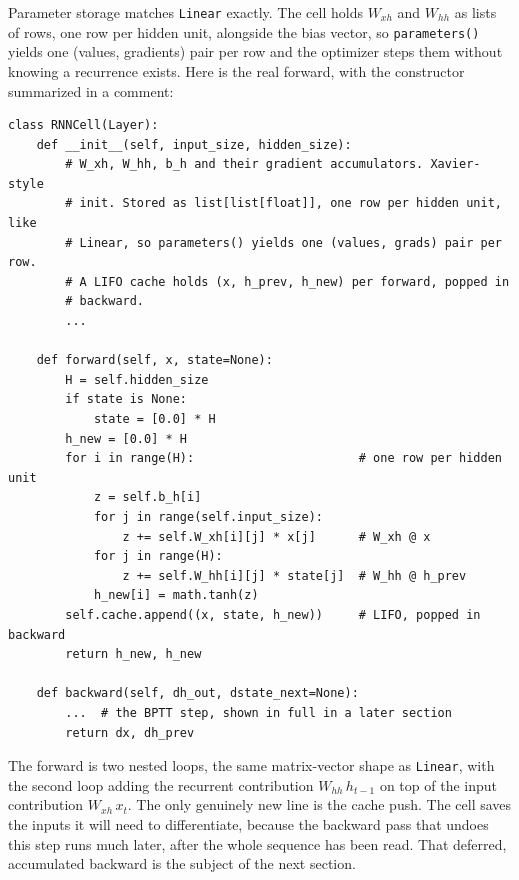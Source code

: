 Parameter storage matches \texttt{Linear} exactly. The cell holds $W_{xh}$
and $W_{hh}$ as lists of rows, one row per hidden unit, alongside the bias
vector, so \texttt{parameters()} yields one (values, gradients) pair per row
and the optimizer steps them without knowing a recurrence exists. Here is
the real forward, with the constructor summarized in a comment:
\begin{lstlisting}
class RNNCell(Layer):
    def __init__(self, input_size, hidden_size):
        # W_xh, W_hh, b_h and their gradient accumulators. Xavier-style
        # init. Stored as list[list[float]], one row per hidden unit, like
        # Linear, so parameters() yields one (values, grads) pair per row.
        # A LIFO cache holds (x, h_prev, h_new) per forward, popped in
        # backward.
        ...

    def forward(self, x, state=None):
        H = self.hidden_size
        if state is None:
            state = [0.0] * H
        h_new = [0.0] * H
        for i in range(H):                       # one row per hidden unit
            z = self.b_h[i]
            for j in range(self.input_size):
                z += self.W_xh[i][j] * x[j]      # W_xh @ x
            for j in range(H):
                z += self.W_hh[i][j] * state[j]  # W_hh @ h_prev
            h_new[i] = math.tanh(z)
        self.cache.append((x, state, h_new))     # LIFO, popped in backward
        return h_new, h_new

    def backward(self, dh_out, dstate_next=None):
        ...  # the BPTT step, shown in full in a later section
        return dx, dh_prev
\end{lstlisting}
The forward is two nested loops, the same matrix-vector shape as
\texttt{Linear}, with the second loop adding the recurrent contribution
$W_{hh}\, h_{t-1}$ on top of the input contribution $W_{xh}\, x_t$. The only
genuinely new line is the cache push. The cell saves the inputs it will need
to differentiate, because the backward pass that undoes this step runs much
later, after the whole sequence has been read. That deferred, accumulated
backward is the subject of the next section.
